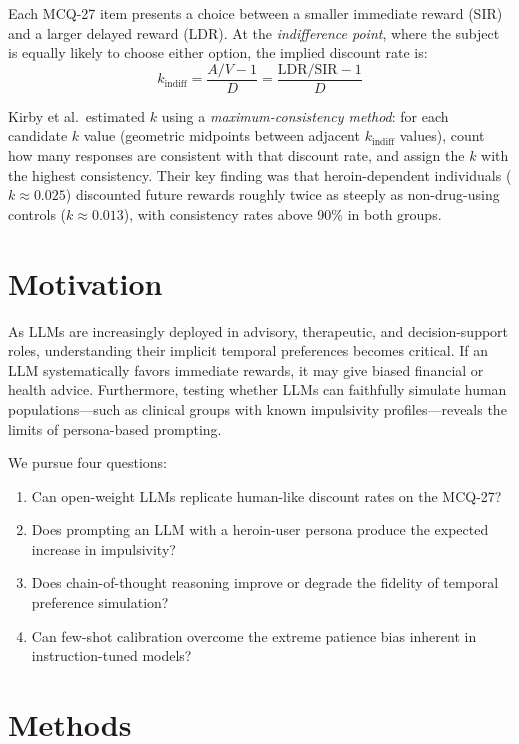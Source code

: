 \documentclass[11pt,a4paper]{article}
\begin{document}
Each MCQ-27 item presents a choice between a smaller immediate reward (SIR) and a larger delayed reward (LDR). At the \emph{indifference point}, where the subject is equally likely to choose either option, the implied discount rate is:
\begin{equation}
k_{\text{indiff}} = \frac{A/V - 1}{D} = \frac{\text{LDR}/\text{SIR} - 1}{D}
\end{equation}

Kirby et al.\ estimated $k$ using a \emph{maximum-consistency method}: for each candidate $k$ value (geometric midpoints between adjacent $k_{\text{indiff}}$ values), count how many responses are consistent with that discount rate, and assign the $k$ with the highest consistency. Their key finding was that heroin-dependent individuals ($k \approx 0.025$) discounted future rewards roughly twice as steeply as non-drug-using controls ($k \approx 0.013$), with consistency rates above 90\% in both groups.

\section{Motivation}

As LLMs are increasingly deployed in advisory, therapeutic, and decision-support roles, understanding their implicit temporal preferences becomes critical. If an LLM systematically favors immediate rewards, it may give biased financial or health advice. Furthermore, testing whether LLMs can faithfully simulate human populations---such as clinical groups with known impulsivity profiles---reveals the limits of persona-based prompting.

We pursue four questions:
\begin{enumerate}
    \item Can open-weight LLMs replicate human-like discount rates on the MCQ-27?
    \item Does prompting an LLM with a heroin-user persona produce the expected increase in impulsivity?
    \item Does chain-of-thought reasoning improve or degrade the fidelity of temporal preference simulation?
    \item Can few-shot calibration overcome the extreme patience bias inherent in instruction-tuned models?
\end{enumerate}

\section{Methods}
\end{document}
